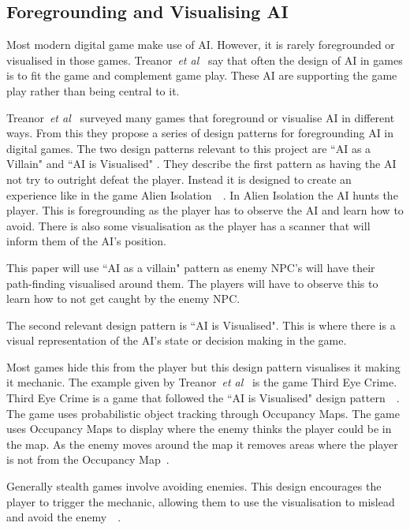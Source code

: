 \documentclass[journal]{IEEEtran}
\begin{document}


\subsection{Foregrounding and Visualising AI}
Most modern digital game make use of AI.  However, it is rarely foregrounded or visualised in those games. Treanor~\textit{et al}~\cite{treanor2015} say that often the design of AI in games is to fit the game and complement game play. These AI are supporting the game play rather than being central to it.

Treanor~\textit{et al}~\cite{treanor2015} surveyed many games that foreground or visualise AI in different ways.    From this they propose a series of design patterns for foregrounding AI in digital games. 
The two design patterns relevant to this project are ``AI as a Villain" and ``AI is Visualised" .  They describe the first pattern as having the AI not try to outright defeat the player. Instead it is designed to create an experience like in the game Alien Isolation~\cite{treanor2015}~\cite{game:AlienIsolation}.  In Alien Isolation the AI hunts the player. This is foregrounding as the player has to observe the AI and learn how to avoid.  There is also some visualisation as the player has a scanner that will inform them of the AI's position. 

This paper will use ``AI as a villain" pattern as enemy NPC's  will have their path-finding visualised around them. The players will have to observe this to learn how to not get caught by the enemy NPC.    


The second relevant design pattern is ``AI is Visualised".  This is where there is a visual representation of the AI's state or decision making in the game. 

Most games hide this from the player but this design pattern visualises it making it mechanic.  
The example given by Treanor~\textit{et al}~\cite{treanor2015} is the game Third Eye Crime.  Third Eye Crime is a game that followed the ``AI is Visualised" design pattern~\cite{Isla2014}~\cite{game:ThirdEyeCrime}.  
The game uses probabilistic object tracking through Occupancy Maps. The game uses Occupancy Maps to display where the enemy thinks the player could be in the map. As the enemy moves around the map it removes areas where the player is not from the Occupancy Map~\cite{Isla2014}.  

Generally stealth games involve avoiding enemies.  This design encourages the player to trigger the mechanic,  allowing them to use the visualisation to mislead and avoid the enemy~\cite{Isla2014}~\cite{game:ThirdEyeCrime}. 
\end{document}
